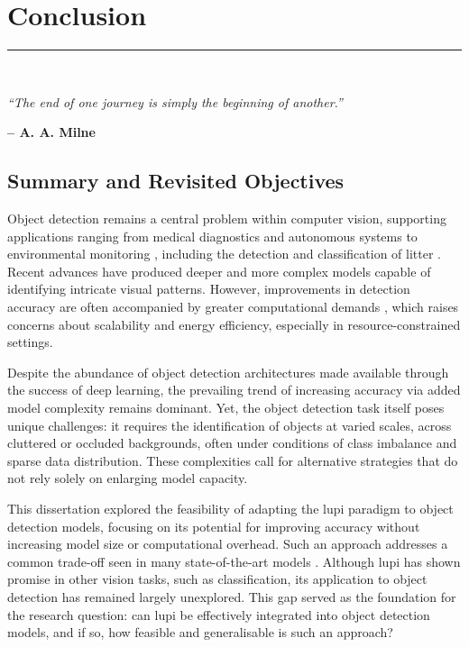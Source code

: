 \graphicspath{{content/chapters/6_conclusion/figures/}}

\chapter{Conclusion}%
\label{chp:conclusion}
\rule{\textwidth}{1pt} \\[1ex]

\epigraph{\textit{``The end of one journey is simply the beginning of another.''}}{\textbf{-- A. A. Milne}}

\section{Summary and Revisited Objectives}
\label{sec:6_summary_objectives}

Object detection remains a central problem within computer vision, supporting applications ranging from medical diagnostics \cite{application_med2} and autonomous systems \cite{application_automation2} to environmental monitoring \cite{application_environment2}, including the detection and classification of litter \cite{soda_dataset}. Recent advances have produced deeper and more complex models capable of identifying intricate visual patterns. However, improvements in detection accuracy are often accompanied by greater computational demands \cite{detr, rt-detr}, which raises concerns about scalability and energy efficiency, especially in resource-constrained settings.

Despite the abundance of object detection architectures made available through the success of deep learning, the prevailing trend of increasing accuracy via added model complexity remains dominant. Yet, the object detection task itself poses unique challenges: it requires the identification of objects at varied scales, across cluttered or occluded backgrounds, often under conditions of class imbalance and sparse data distribution. These complexities call for alternative strategies that do not rely solely on enlarging model capacity.

This dissertation explored the feasibility of adapting the \gls{lupi} paradigm to object detection models, focusing on its potential for improving accuracy without increasing model size or computational overhead. Such an approach addresses a common trade-off seen in many state-of-the-art models \cite{yolov12, rt-detrv2}. Although \gls{lupi} has shown promise in other vision tasks, such as classification, its application to object detection has remained largely unexplored. This gap served as the foundation for the research question: can \gls{lupi} be effectively integrated into object detection models, and if so, how feasible and generalisable is such an approach?

